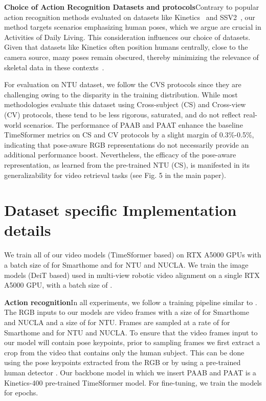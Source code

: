 \documentclass{article}
\begin{document}
\textbf{Choice of Action Recognition Datasets and protocols}\quad Contrary to popular action recognition methods evaluated on datasets like Kinetics~\cite{kinetics} and SSV2~\cite{something}, our method targets scenarios emphasizing human poses, which we argue are crucial in Activities of Daily Living. This consideration influences our choice of datasets. Given that datasets like Kinetics often position humans centrally, close to the camera source, many poses remain obscured, thereby minimizing the relevance of skeletal data in these contexts~\cite{stgcn}.  

For evaluation on NTU dataset, we follow the CVS protocols since they are challenging owing to the disparity in the training distribution. While most methodologies evaluate this dataset using Cross-subject (CS) and Cross-view (CV) protocols, these tend to be less rigorous, saturated, and do not  reflect real-world scenarios. The performance of PAAB and PAAT enhance the baseline TimeSformer metrics on CS and CV protocols by a slight margin of 0.3\%-0.5\%, indicating that pose-aware RGB representations do not necessarily provide an additional performance boost. Nevertheless, the efficacy of the pose-aware representation, as learned from the pre-trained NTU (CS), is manifested in its generalizability for video retrieval tasks (see Fig. 5 in the main paper).

\section{Dataset specific Implementation details}
We train all of our video models (TimeSformer based) on  RTX A5000 GPUs with a batch size of  for Smarthome and  for NTU and NUCLA. We train the image models (DeiT based) used in multi-view robotic video alignment on a single RTX A5000 GPU, with a batch size of .

\textbf{Action recognition}\quad In all experiments, we follow a training pipeline similar to \cite{timesformer}. The RGB inputs to our models are video frames with a size of  for Smarthome and NUCLA and a size of  for NTU. Frames are sampled at a rate of  for Smarthome and  for NTU and NUCLA. To ensure that the video frames input to our model will contain pose keypoints, prior to sampling frames we first extract a  crop from the video that contains only the human subject. This can be done using the pose keypoints extracted from the RGB or by using a pre-trained human detector \cite{fasterrcnn_humandetector}. Our backbone model in which we insert PAAB and PAAT is a Kinetics-400 \cite{kinetics} pre-trained TimeSformer \cite{timesformer} model. For fine-tuning, we train the models for  epochs.
\end{document}
